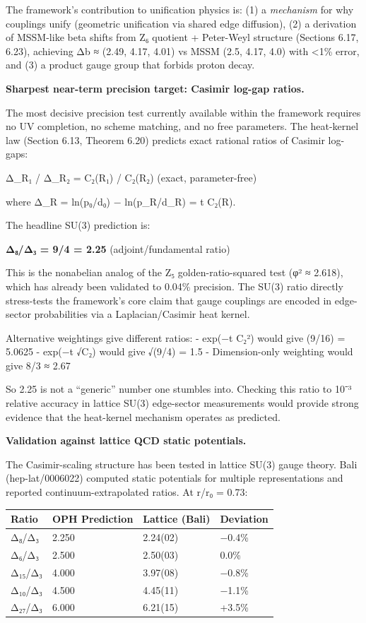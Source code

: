 \documentclass[11pt,a4paper]{article}
\theoremstyle{remark}
\begin{document}
The framework's contribution to unification physics is: (1) a \emph{mechanism} for
why couplings unify (geometric unification via shared edge diffusion), (2) a
derivation of MSSM-like beta shifts from Z₆ quotient + Peter-Weyl structure
(Sections 6.17, 6.23), achieving Δb ≈ (2.49, 4.17, 4.01) vs MSSM (2.5, 4.17, 4.0)
with \textless1\% error, and (3) a product gauge group that forbids proton decay.

\textbf{Sharpest near-term precision target: Casimir log-gap ratios.}

The most decisive precision test currently available within the framework requires no UV completion, no scheme matching, and no free parameters. The heat-kernel law (Section 6.13, Theorem 6.20) predicts exact rational ratios of Casimir log-gaps:

Δ\_R₁ / Δ\_R₂ = C₂(R₁) / C₂(R₂) (exact, parameter-free)

where Δ\_R = ln(p₀/d₀) − ln(p\_R/d\_R) = t C₂(R).

The headline SU(3) prediction is:

\textbf{Δ₈/Δ₃ = 9/4 = 2.25} (adjoint/fundamental ratio)

This is the nonabelian analog of the Z₅ golden-ratio-squared test
(φ² ≈ 2.618), which has already been validated to 0.04\% precision.
The SU(3) ratio directly stress-tests the framework's core claim that gauge
couplings are encoded in edge-sector probabilities via a Laplacian/Casimir
heat kernel.

Alternative weightings give different ratios:
- exp(−t C₂²) would give (9/16) = 5.0625
- exp(−t √C₂) would give √(9/4) = 1.5
- Dimension-only weighting would give 8/3 ≈ 2.67

So 2.25 is not a ``generic'' number one stumbles into. Checking this ratio
to 10⁻³ relative accuracy in lattice SU(3) edge-sector measurements
would provide strong evidence that the heat-kernel mechanism operates as
predicted.

\textbf{Validation against lattice QCD static potentials.}

The Casimir-scaling structure has been tested in lattice SU(3) gauge theory. Bali (hep-lat/0006022) computed static potentials for multiple representations and reported continuum-extrapolated ratios. At r/r₀ = 0.73:

{\def\LTcaptype{none} %
\begin{longtable}[]{@{}llll@{}}
\toprule\noalign{}
Ratio & OPH Prediction & Lattice (Bali) & Deviation \\
\midrule\noalign{}
\endhead
\bottomrule\noalign{}
\endlastfoot
Δ₈/Δ₃ & 2.250 & 2.24(02) & −0.4\% \\
Δ₆/Δ₃ & 2.500 & 2.50(03) & 0.0\% \\
Δ₁₅/Δ₃ & 4.000 & 3.97(08) & −0.8\% \\
Δ₁₀/Δ₃ & 4.500 & 4.45(11) & −1.1\% \\
Δ₂₇/Δ₃ & 6.000 & 6.21(15) & +3.5\% \\
\end{longtable}
}
\end{document}
